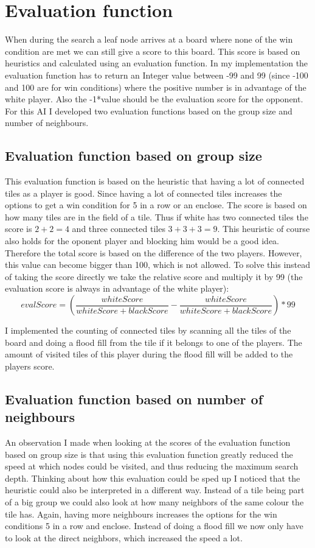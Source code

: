 \documentclass{article}
\begin{document}
\section{Evaluation function}
When during the search a leaf node arrives at a board where none of the win condition are met we can still give a score to this board. This score is based on heuristics and calculated using an evaluation function. In my implementation the evaluation function has to return an Integer value between -99 and 99 (since -100 and 100 are for win conditions) where the positive number is in advantage of the white player. Also the -1*value should be the evaluation score for the opponent. For this AI I developed two evaluation functions based on the group size and number of neighbours.

\subsection{Evaluation function based on group size}
This evaluation function is based on the heuristic that having a lot of connected tiles as a player is good. Since having a lot of connected tiles increases the options to get a win condition for 5 in a row or an enclose. The score is based on how many tiles are in the field of a tile. Thus if white has two connected tiles the score is $2+2=4$ and three connected tiles $3+3+3=9$. This heuristic of course also holds for the oponent player and blocking him would be a good idea. Therefore the total score is based on the difference of the two players. However, this value can become bigger than 100, which is not allowed. To solve this instead of taking the score directly we take the relative score and multiply it by 99 (the evaluation score is always in advantage of the white player): 
\begin{equation*}
    evalScore = \left(\frac{whiteScore}{whiteScore+blackScore}-\frac{whiteScore}{whiteScore+blackScore}\right)*99
    \label{eq:relativeScore}
\end{equation*}

I implemented the counting of connected tiles by scanning all the tiles of the board and doing a flood fill from the tile if it belongs to one of the players. The amount of visited tiles of this player during the flood fill will be added to the players score. 

\subsection{Evaluation function based on number of neighbours}
An observation I made when looking at the scores of the evaluation function based on group size is that using this evaluation function greatly reduced the speed at which nodes could be visited, and thus reducing the maximum search depth. Thinking about how this evaluation could be sped up I noticed that the heuristic could also be interpreted in a different way. Instead of a tile being part of a big group we could also look at how many neighbors of the same colour the tile has. Again, having more neighbours increases the options for the win conditions 5 in a row and enclose. Instead of doing a flood fill we now only have to look at the direct neighbors, which increased the speed a lot.
\end{document}
